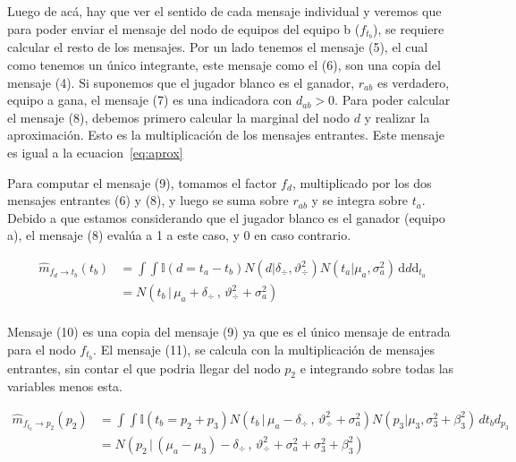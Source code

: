 \documentclass[11pt,twoside, spanish]{report} %
\begin{document}
Luego de ac\'a, hay que ver el sentido de cada mensaje individual y veremos que para poder enviar el mensaje del nodo de equipos del equipo b ($f_{t_b}$), se requiere calcular el resto de los mensajes.
Por un lado tenemos el mensaje (5), el cual como tenemos un \'unico integrante, este mensaje como el (6), son una copia del mensaje (4).
Si suponemos que el jugador blanco es el ganador, $r_{ab}$ es verdadero, equipo a gana, el mensaje (7) es una indicadora con $d_{ab}>0$.
Para poder calcular el mensaje (8), debemos primero calcular la marginal del nodo $d$ y realizar la aproximaci\'on.
Esto es la multiplicaci\'on de los mensajes entrantes.
Este mensaje es igual a la ecuacion~\ref{eq:aprox}

Para computar el mensaje (9), tomamos el factor $f_d$, multiplicado por los dos mensajes entrantes (6) y (8), y luego se suma sobre $r_{ab}$ y se integra sobre $t_a$.
Debido a que estamos considerando que el jugador blanco es el ganador (equipo a), el mensaje (8) eval\'ua a 1 a este caso, y 0 en caso contrario.

\begin{equation}
\begin{split}
\widehat{m}_{f_{d} \rightarrow t_b}(t_b)  & = \int \int \mathbb{I}(d = t_a - t_b) N(d | \delta_{\div}, \vartheta_{\div}^2) N(t_a | \mu_a , \sigma_a^2 )  \, \text{d}{d} \text{d}_{t_a} \\
&= N(t_b \, | \, \mu_a + \delta_{\div} \, , \, \vartheta_{\div}^2 + \sigma_a^2) \\
\end{split}
\end{equation}

Mensaje (10) es una copia del mensaje (9) ya que es el \'unico mensaje de entrada para el nodo $f_{t_b}$.
El mensaje (11), se calcula con la multiplicaci\'on de mensajes entrantes, sin contar el que podria llegar del nodo $p_2$ e integrando sobre todas las variables menos esta.

\begin{equation}
\begin{split}
\widehat{m}_{f_{t_b} \rightarrow p_2}(p_2)  & =\int \int \mathbb{I}(t_b = p_2 + p_3) N(t_b \, | \, \mu_a - \delta_{\div} \, , \, \vartheta_{\div}^2 + \sigma_a^2) N(p_3 | \mu_3 , \sigma_3^2 + \beta_3^2)  \, d{t_b} d_{p_3} \\
&=  N( p_2 \,|\,  (\mu_a - \mu_3) - \delta_{\div}  \,,\,\vartheta_{\div}^2 + \sigma_a^2 + \sigma_3^2 + \beta_3^2)  \\
\end{split}
\end{equation}
\end{document}
